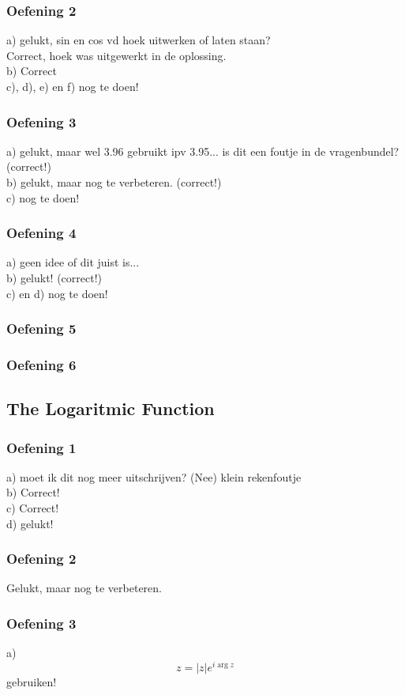 \documentclass[a4paper,twoside]{article}
\theoremstyle{definition}
\theoremstyle{plain}
\begin{document}
\subsubsection{Oefening 2}
a) gelukt, sin en cos vd hoek uitwerken of laten staan?\\
Correct, hoek was uitgewerkt in de oplossing.\\
b) Correct\\
c), d), e) en f) nog te doen!
\subsubsection{Oefening 3}
a) gelukt, maar wel 3.96 gebruikt ipv 3.95... is dit een foutje in de vragenbundel? (correct!)\\
b) gelukt, maar nog te verbeteren. (correct!)\\
c) nog te doen!
\subsubsection{Oefening 4}
a) geen idee of dit juist is...\\
b) gelukt! (correct!)\\
c) en d) nog te doen!
\subsubsection{Oefening 5}
\subsubsection{Oefening 6}
\subsection{The Logaritmic Function}
\subsubsection{Oefening 1}
a) moet ik dit nog meer uitschrijven? (Nee) klein rekenfoutje\\
b) Correct!\\
c) Correct!\\
d) gelukt!
\subsubsection{Oefening 2}
Gelukt, maar nog te verbeteren.
\subsubsection{Oefening 3}
a)
\[
z = |z|e^{i \arg z}
\]
gebruiken!
\end{document}
